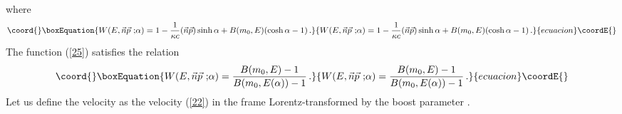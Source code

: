 \documentclass[a4paper,12pt]{article}
\begin{document}
\renewcommand{\theequation}{\arabic{equation}}
\setcounter{equation}{24} where
\begin{equation}\coord{}\boxEquation{\label{25}
  W(E, \vec{n}\vec{p}{\ ;} \alpha)
  = 1 - \frac{1}{\kappa c} (\vec{n}\vec{p})\sinh \alpha +
  B( m_0 , E) ( \cosh \alpha - 1)\, .
}{W(E, \vec{n}\vec{p}{\ ;} \alpha)
  = 1 - \frac{1}{\kappa c} (\vec{n}\vec{p})\sinh \alpha +
  B( m_0 , E) ( \cosh \alpha - 1)\, .
}{ecuacion}\coordE{}\end{equation}
The function (\ref{25}) satisfies the relation
\begin{equation}\coord{}\boxEquation{\label{26}
  W(E, \vec{n}\vec{p}{\ ;}\alpha)
  = \frac{B(m_0 , E)- 1}{B(m_0 , E(\alpha))-1}\, .
}{W(E, \vec{n}\vec{p}{\ ;}\alpha)
  = \frac{B(m_0 , E)- 1}{B(m_0 , E(\alpha))-1}\, .
}{ecuacion}\coordE{}\end{equation}
Let us define the velocity \coordHE{} as the velocity (\ref{22})
in the frame Lorentz-transformed by the boost parameter \coordHE{}.
\end{document}
